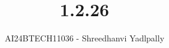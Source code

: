 \documentclass[journal]{IEEEtran}
\begin{document}

\vspace{3cm}

\title{1.2.26}
\author{AI24BTECH11036 - Shreedhanvi Yadlpally}

{\let\newpage\relax\maketitle}

\renewcommand{\thefigure}{\theenumi}
\renewcommand{\thetable}{\theenumi}
\setlength{\intextsep}{10pt} %


\renewcommand{\thetable}{\theenumi}
\end{document}
